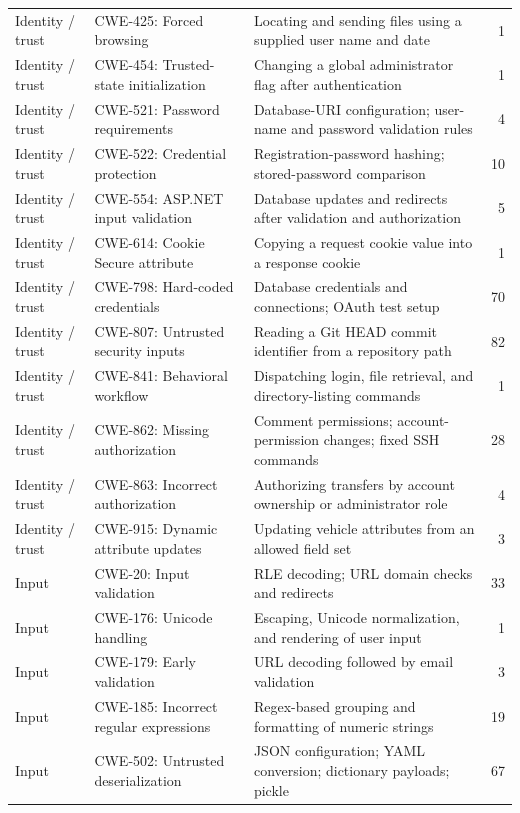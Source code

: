 \begin{longtable}{@{}>{\raggedright\arraybackslash}p{.13\linewidth} >{\raggedright\arraybackslash}p{.25\linewidth} >{\raggedright\arraybackslash}p{} r@{}}
Identity / trust & CWE-425: Forced browsing & Locating and sending files using a supplied user name and date & 1 \\
Identity / trust & CWE-454: Trusted-state initialization & Changing a global administrator flag after authentication & 1 \\
Identity / trust & CWE-521: Password requirements & Database-URI configuration; user-name and password validation rules & 4 \\
Identity / trust & CWE-522: Credential protection & Registration-password hashing; stored-password comparison & 10 \\
Identity / trust & CWE-554: ASP.NET input validation & Database updates and redirects after validation and authorization & 5 \\
Identity / trust & CWE-614: Cookie Secure attribute & Copying a request cookie value into a response cookie & 1 \\
Identity / trust & CWE-798: Hard-coded credentials & Database credentials and connections; OAuth test setup & 70 \\
Identity / trust & CWE-807: Untrusted security inputs & Reading a Git HEAD commit identifier from a repository path & 82 \\
Identity / trust & CWE-841: Behavioral workflow & Dispatching login, file retrieval, and directory-listing commands & 1 \\
Identity / trust & CWE-862: Missing authorization & Comment permissions; account-permission changes; fixed SSH commands & 28 \\
Identity / trust & CWE-863: Incorrect authorization & Authorizing transfers by account ownership or administrator role & 4 \\
Identity / trust & CWE-915: Dynamic attribute updates & Updating vehicle attributes from an allowed field set & 3 \\
\midrule
Input & CWE-20: Input validation & RLE decoding; URL domain checks and redirects & 33 \\
Input & CWE-176: Unicode handling & Escaping, Unicode normalization, and rendering of user input & 1 \\
Input & CWE-179: Early validation & URL decoding followed by email validation & 3 \\
Input & CWE-185: Incorrect regular expressions & Regex-based grouping and formatting of numeric strings & 19 \\
Input & CWE-502: Untrusted deserialization & JSON configuration; YAML conversion; dictionary payloads; pickle & 67 \\

\end{longtable}
